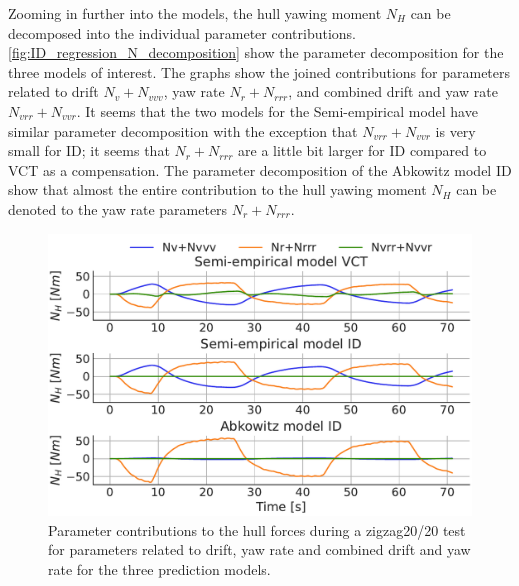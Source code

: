 Zooming in further into the models, the hull yawing moment $N_H$ can be decomposed into the individual parameter contributions. \autoref{fig:ID_regression_N_decomposition} show the parameter decomposition for the three models of interest. The graphs show the joined contributions for parameters related to drift $N_v+N_{vvv}$, yaw rate $N_r+N_{rrr}$, and combined drift and yaw rate $N_{vrr}+N_{vvr}$. It seems that the two models for the Semi-empirical model have similar parameter decomposition with the exception that $N_{vrr}+N_{vvr}$ is very small for ID; it seems that $N_r+N_{rrr}$ are a little bit larger for ID compared to VCT as a compensation.
The parameter decomposition of the Abkowitz model ID show that almost the entire contribution to the hull yawing moment $N_H$ can be denoted to the yaw rate parameters $N_r+N_{rrr}$. 
\begin{figure}[h!]
    \includegraphics[width=\textwidth]{figures/result_ID_regression.ID_regression_N_decomposition.pdf}
    \caption{Parameter contributions to the hull forces during a zigzag20/20 test for parameters related to drift, yaw rate and combined drift and yaw rate for the three prediction models.}
    \label{fig:ID_regression_N_decomposition}
\end{figure}